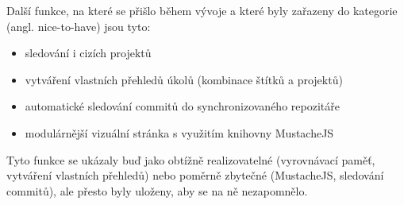 Další funkce, na které se přišlo během vývoje a které byly zařazeny do kategorie  (angl. nice-to-have) jsou tyto:

\begin{itemize}
\item sledování i cizích projektů
\item vytváření vlastních přehledů úkolů (kombinace štítků a projektů)
\item automatické sledování commitů do synchronizovaného repozitáře
\item modulárnější vizuální stránka s využitím knihovny MustacheJS\cite{mustache}
\end{itemize}

Tyto funkce se ukázaly buď jako obtížně realizovatelné (vyrovnávací paměť, vytváření vlastních přehledů) nebo poměrně zbytečné (MustacheJS, sledování commitů), ale přesto byly uloženy, aby se na ně nezapomnělo.